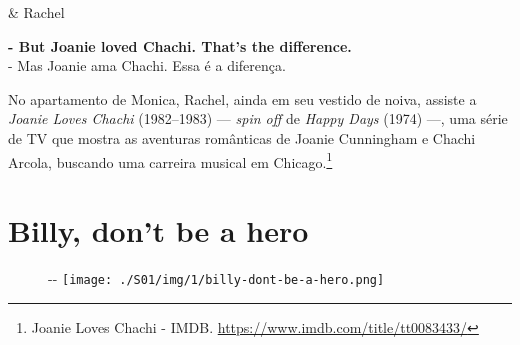 \begin{tcolorbox}[enhanced,center upper,
    drop fuzzy shadow southeast, boxrule=0.3pt,
    lower separated=false, breakable,
    colframe=black!30!dialogoBorder,colback=white]
\begin{minipage}[c]{0.16\linewidth}
   & \centering \scriptsize{Rachel}
\end{minipage}
\hfill
\begin{minipage}[c]{0.8\linewidth}
  \textbf{- But Joanie loved Chachi. That's the difference.}\\
  - Mas Joanie ama Chachi. Essa é a diferença.
\end{minipage}
\end{tcolorbox}

No apartamento de Monica, Rachel, ainda em seu vestido de noiva, assiste
a \emph{Joanie Loves Chachi} (1982--1983) --- \emph{spin off} de
\emph{Happy Days} (1974) ---, uma série de TV que mostra as aventuras
românticas de Joanie Cunningham e Chachi Arcola, buscando uma carreira
musical em Chicago.\footnote{\sloppy Joanie Loves Chachi - IMDB. \url{https://www.imdb.com/title/tt0083433/}}

\hypertarget{billy-dont-be-a-hero}{%
\section{Billy, don't be a hero}\label{billy-dont-be-a-hero}}

\begin{figure}[!ht]
  \begin{adjustwidth}{-\oddsidemargin-1in}{-\rightmargin}
    \centering
    \texttt{[image: ./S01/img/1/billy-dont-be-a-hero.png]}
  \end{adjustwidth}
\end{figure}

